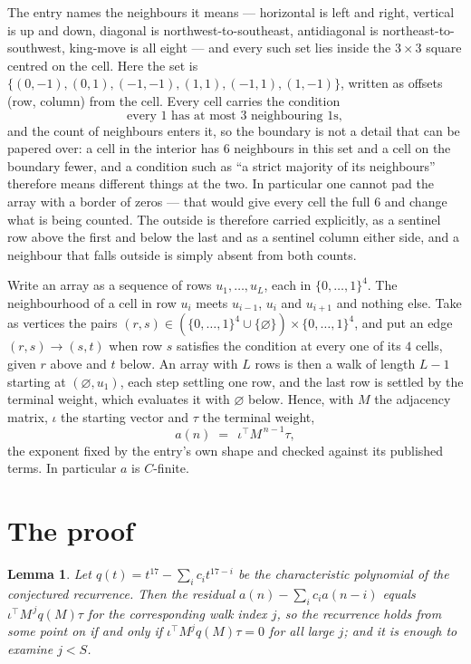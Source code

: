 \documentclass[11pt,a4paper]{article}
\theoremstyle{plain}
\newtheorem{lemma}[theorem]{Lemma}
\theoremstyle{definition}
\begin{document}
The entry names the neighbours it means --- horizontal is left and right, vertical is up and
down, diagonal is northwest-to-southeast, antidiagonal is northeast-to-southwest, king-move is
all eight --- and every such set lies inside the $3\times3$ square centred on the cell. Here
the set is $\{(0,-1), (0,1), (-1,-1), (1,1), (-1,1), (1,-1)\}$, written as offsets (row, column) from the cell. Every cell carries
the condition
\[
\text{every 1 has at most 3 neighbouring 1s},
\]
and the count of neighbours enters it, so the boundary is not a detail that can be papered
over: a cell in the interior has $6$ neighbours in this set and a cell on the boundary
fewer, and a condition such as ``a strict majority of its neighbours'' therefore means
different things at the two. In particular one cannot pad the array with a border of zeros ---
that would give every cell the full $6$ and change what is being counted. The outside is
therefore carried
explicitly, as a sentinel row above the first and below the last and as a sentinel column
either side, and a neighbour that falls outside is simply absent from both counts.

Write an array as a sequence of rows $u_1,\dots,u_L$, each in
$\{0,\dots,1\}^{4}$. The neighbourhood of a cell in row $u_i$ meets $u_{i-1}$,
$u_i$ and $u_{i+1}$ and nothing else. Take as vertices the pairs
$(r,s)\in(\{0,\dots,1\}^{4}\cup\{\varnothing\})\times\{0,\dots,1\}^{4}$,
and put an edge $(r,s)\to(s,t)$ when row $s$ satisfies the condition at every one of its
$4$ cells, given $r$ above and $t$ below. An array with $L$ rows is then a walk of length
$L-1$ starting at $(\varnothing,u_1)$, each step settling one row, and the last row is
settled by the terminal weight, which evaluates it with $\varnothing$ below. Hence,
with $M$ the adjacency matrix, $\iota$ the starting vector and $\tau$ the terminal weight,
\[
a(n)\;=\;\,\iota^{\!\top}M^{\,n-1}\tau ,
\]
the exponent fixed by the entry's own shape and checked against its published terms. In
particular $a$ is $C$-finite.

\section{The proof}

\begin{lemma}\label{lem:crit}
Let $q(t)=t^{17}-\sum_i c_it^{17-i}$ be the characteristic polynomial of the
conjectured recurrence. Then the residual $a(n)-\sum_ic_ia(n-i)$ equals
$\iota^{\!\top}M^{\,j}q(M)\tau$ for the corresponding walk index $j$, so the
recurrence holds from some point on if and only if $\iota^{\!\top}M^{j}q(M)\tau=0$ for all
large $j$; and it is enough to examine $j<S$.
\end{lemma}
\end{document}
